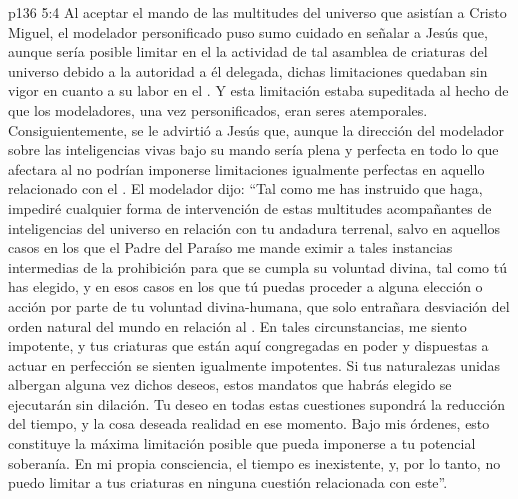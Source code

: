 \vs p136 5:4 Al aceptar el mando de las multitudes del universo que asistían a Cristo Miguel, el modelador personificado puso sumo cuidado en señalar a Jesús que, aunque sería posible limitar en el  la actividad de tal asamblea de criaturas del universo debido a la autoridad a él delegada, dichas limitaciones quedaban sin vigor en cuanto a su labor en el . Y esta limitación estaba supeditada al hecho de que los modeladores, una vez personificados, eran seres atemporales. Consiguientemente, se le advirtió a Jesús que, aunque la dirección del modelador sobre las inteligencias vivas bajo su mando sería plena y perfecta en todo lo que afectara al  no podrían imponerse limitaciones igualmente perfectas en aquello relacionado con el . El modelador dijo: “Tal como me has instruido que haga, impediré cualquier forma de intervención de estas multitudes acompañantes de inteligencias del universo en relación con tu andadura terrenal, salvo en aquellos casos en los que el Padre del Paraíso me mande eximir a tales instancias intermedias de la prohibición para que se cumpla su voluntad divina, tal como tú has elegido, y en esos casos en los que tú puedas proceder a alguna elección o acción por parte de tu voluntad divina\hyp{}humana, que solo entrañara desviación del orden natural del mundo en relación al . En tales circunstancias, me siento impotente, y tus criaturas que están aquí congregadas en poder y dispuestas a actuar en perfección se sienten igualmente impotentes. Si tus naturalezas unidas albergan alguna vez dichos deseos, estos mandatos que habrás elegido se ejecutarán sin dilación. Tu deseo en todas estas cuestiones supondrá la reducción del tiempo, y la cosa deseada  realidad en ese momento. Bajo mis órdenes, esto constituye la máxima limitación posible que pueda imponerse a tu potencial soberanía. En mi propia consciencia, el tiempo es inexistente, y, por lo tanto, no puedo limitar a tus criaturas en ninguna cuestión relacionada con este”.
